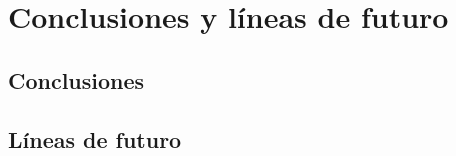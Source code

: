 \chapter{Conclusiones y líneas de futuro}\label{cap:conclusiones}
\section{Conclusiones}
\section{Líneas de futuro}